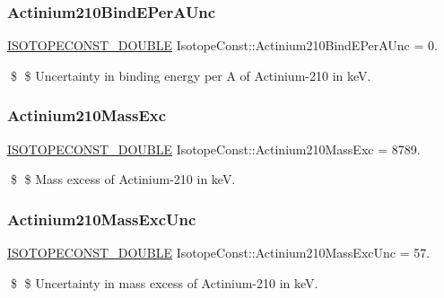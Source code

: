 \subsubsection{\texorpdfstring{Actinium210\+Bind\+E\+Per\+A\+Unc}{Actinium210BindEPerAUnc}}
{\footnotesize\ttfamily \mbox{\hyperlink{group___isotope_const-_macros_ga8f45a7272ce02c0b4c65c44636ed719a}{I\+S\+O\+T\+O\+P\+E\+C\+O\+N\+S\+T\+\_\+\+D\+O\+U\+B\+LE}} Isotope\+Const\+::\+Actinium210\+Bind\+E\+Per\+A\+Unc = 0.}

\$ \$ Uncertainty in binding energy per A of Actinium-\/210 in keV. \mbox{\label{group___isotope_const-_actinium-_ac210_ga7966d0984f0e9960518c5bbefd3096f5}} 
\subsubsection{\texorpdfstring{Actinium210\+Mass\+Exc}{Actinium210MassExc}}
{\footnotesize\ttfamily \mbox{\hyperlink{group___isotope_const-_macros_ga8f45a7272ce02c0b4c65c44636ed719a}{I\+S\+O\+T\+O\+P\+E\+C\+O\+N\+S\+T\+\_\+\+D\+O\+U\+B\+LE}} Isotope\+Const\+::\+Actinium210\+Mass\+Exc = 8789.}

\$ \$ Mass excess of Actinium-\/210 in keV. \mbox{\label{group___isotope_const-_actinium-_ac210_gab0100ddd4d70513c5f1b4a19ce8ef330}} 
\subsubsection{\texorpdfstring{Actinium210\+Mass\+Exc\+Unc}{Actinium210MassExcUnc}}
{\footnotesize\ttfamily \mbox{\hyperlink{group___isotope_const-_macros_ga8f45a7272ce02c0b4c65c44636ed719a}{I\+S\+O\+T\+O\+P\+E\+C\+O\+N\+S\+T\+\_\+\+D\+O\+U\+B\+LE}} Isotope\+Const\+::\+Actinium210\+Mass\+Exc\+Unc = 57.}

\$ \$ Uncertainty in mass excess of Actinium-\/210 in keV. \mbox{\label{group___isotope_const-_actinium-_ac210_ga8ed924694f679867b95a377253c86498}} 
